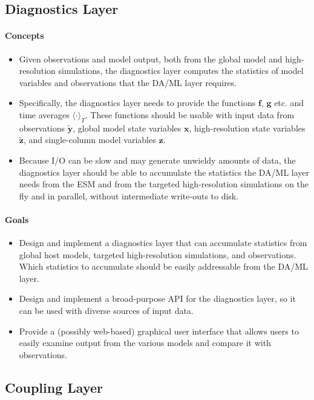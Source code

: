 \documentclass{article}
\renewcommand{\vec}[1]{\boldsymbol{{#1}}}
\begin{document}
\subsection{Diagnostics Layer}

\paragraph{Concepts}
\begin{itemize}
    \item  Given observations and model output, both from the global model and high-resolution simulations, the diagnostics layer computes the statistics of model variables and observations that the DA/ML layer requires.
    \item Specifically, the diagnostics layer needs to provide the functions $\vec{f}$, $\vec{g}$ etc. and time averages $\langle \cdot \rangle_T$. These functions should be usable with input data from observations $\vec{\tilde y}$, global model state variables $\vec{x}$, high-resolution state variables $\vec{\tilde z}$, and single-column model variables $\vec{z}$.
    \item Because I/O can be slow and may generate unwieldy amounts of data, the diagnostics layer should be able to accumulate the statistics the DA/ML layer needs from the ESM and from the targeted high-resolution simulations on the fly and in parallel, without intermediate write-outs to disk.
\end{itemize}

\paragraph{Goals}
\begin{itemize}
    \item Design and implement a diagnostics layer that can accumulate statistics from global host models, targeted high-resolution simulations, and observations. Which statistics to accumulate should be easily addressable from the DA/ML layer.
    \item Design and implement a broad-purpose API for the diagnostics layer, so it can be used with diverse sources of input data. 
    \item Provide a (possibly web-based) graphical user interface that allows users to easily examine output from the various models and compare it with observations.
\end{itemize}

\subsection{Coupling Layer}
\end{document}
